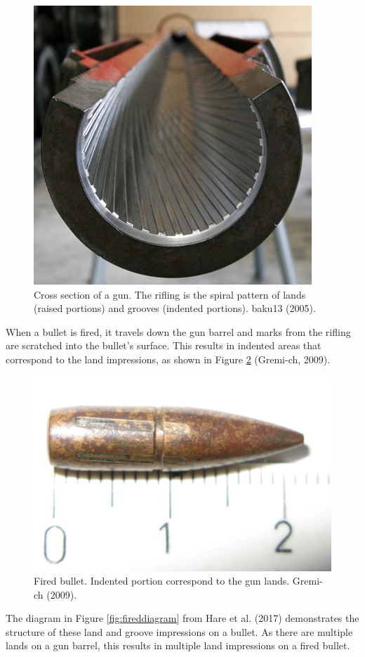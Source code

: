 \documentclass[print]{nuthesis}
\begin{document}
\begin{figure}

{\centering \includegraphics[width=0.5\linewidth]{images/rifling} 

}

\caption{Cross section of a gun. The rifling is the spiral pattern of lands (raised portions) and grooves (indented portions). baku13 (2005).}\label{fig:rifling}
\end{figure}

When a bullet is fired, it travels down the gun barrel and marks from the rifling are scratched into the bullet's surface.
This results in indented areas that correspond to the land impressions, as shown in Figure \ref{fig:fired} (Gremi-ch, 2009).

\begin{figure}

{\centering \includegraphics[width=0.5\linewidth]{images/fired_bullet} 

}

\caption{Fired bullet. Indented portion correspond to the gun lands. Gremi-ch (2009).}\label{fig:fired}
\end{figure}

The diagram in Figure \ref{fig:fireddiagram} from Hare et al. (2017) demonstrates the structure of these land and groove impressions on a bullet.
As there are multiple lands on a gun barrel, this results in multiple land impressions on a fired bullet.
\end{document}
